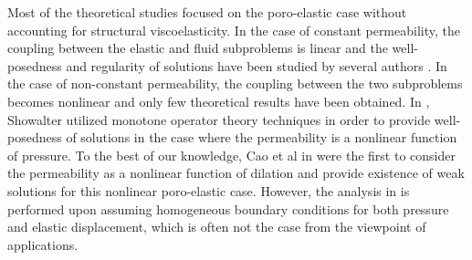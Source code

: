 \documentclass[12pt,a4paper]{amsart}
\theoremstyle{definition}
\begin{document}
Most of the theoretical studies focused on the poro-elastic case without accounting for structural viscoelasticity. In  the case of constant permeability, the coupling between the elastic and fluid subproblems is linear and the well-posedness and regularity of solutions have been studied by several authors \cite{zenisek, owczarek,show1}.
In the case of non-constant permeability, the coupling between the two subproblems becomes nonlinear and only few theoretical results have been obtained. In \cite{show2}, Showalter utilized monotone operator theory techniques in order to provide well-posedness of solutions in the case where the permeability is a nonlinear function of pressure.
%
%
%
To the best of our knowledge, Cao et al in \cite{cao} were the first to consider the permeability as a nonlinear function of dilation and provide existence of weak solutions for this nonlinear poro-elastic case. However, the analysis in \cite{cao} is performed upon assuming 
homogeneous boundary conditions for both pressure and elastic displacement, which is often not the case from the viewpoint of applications.
\end{document}
